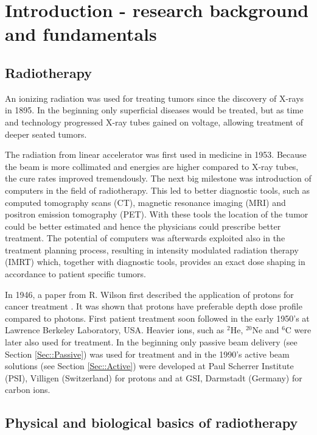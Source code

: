 \chapter{Introduction - research background and fundamentals}
\label{chapter:intro}
\minitoc

\section{Radiotherapy}

An ionizing radiation was used for treating tumors since the discovery of X-rays in 1895. In the beginning only superficial diseases would be treated, but as time and technology progressed X-ray tubes gained on voltage, allowing treatment of deeper seated tumors.

The radiation from linear accelerator was first used in medicine in 1953. Because the beam is more collimated and energies are
higher compared to X-ray tubes, the cure rates improved tremendously. The next big milestone was introduction of computers in the field
of radiotherapy. This led to better diagnostic tools, such as computed tomography scans (CT), magnetic resonance imaging (MRI) and
positron emission tomography (PET). With these tools the location of the tumor could be better estimated and hence the physicians
could prescribe better treatment. The potential of computers was afterwards exploited also in the treatment planning process, resulting in intensity modulated
radiation therapy (IMRT) which, together with diagnostic tools, provides an exact dose shaping in accordance to patient specific tumors.

In 1946, a paper from R. Wilson first described the application of protons for cancer treatment \cite{Wilson1946}. It was shown that protons have preferable depth dose profile compared to photons. First patient treatment soon followed in the early 1950's at Lawrence Berkeley Laboratory, USA. Heavier ions, such as 
$^{2}$He, $^{20}$Ne and $^6$C were later also used for treatment. In the beginning only passive beam delivery (see Section \ref{Sec::Passive}) was used for treatment and in the 1990's active beam solutions (see Section \ref{Sec::Active}) were developed at Paul Scherrer Institute (PSI), Villigen (Switzerland) for protons and at GSI, Darmstadt (Germany) for carbon ions.


\section{Physical and biological basics of radiotherapy}


